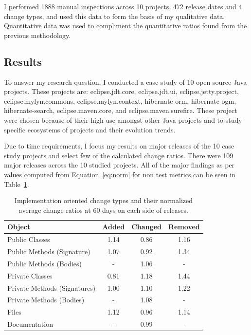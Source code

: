 I performed 1888 manual inspections across 10 projects, 472 release dates and 4 change types, and used this data to form the basis of my qualitative data.
Quantitative data was used to compliment the quantitative ratios found from the previous methodology. 

\subsection{Results}
\label{sec:apie-results}

To answer my research question, I conducted a case study of 10 open source Java projects. These projects are: eclipse.jdt.core, eclipse.jdt.ui, eclipse.jetty.project, 
eclipse.mylyn.commons, eclipse.mylyn.context, hibernate-orm, hibernate-ogm, hibernate-search, eclipse.maven.core, and eclipse.maven.surefire. These project were chosen
because of their high use amongst other Java projects and to study specific ecosystems of projects and their evolution trends.

Due to time requirements, I focus my results on major releases of the 10 case study projects and select few of the calculated change ratios. 
There were 109 major releases across the 10 studied projects. All of the major findings as per values computed from Equation~\ref{eq:norm} for non test metrics
can be seen in Table~\ref{tab:apie-ratio}.

\begin{table}[ht]
\begin{center}
\tabcolsep=0.11cm
\begin{tabular}{| l | c | c | c |}
\hline
Object & Added & Changed & Removed\\
\hline
Public Classes & 1.14 & 0.86 & 1.16 \\
Public Methods (Signature) & 1.07 & 0.92 & 1.34 \\
Public Methods (Bodies) & - & 1.06 & - \\
Private Classes & 0.81 & 1.18 & 1.44 \\
Private Methods (Signatures) & 1.00 & 1.10 & 1.22 \\
Private Methods (Bodies) & - & 1.08 & - \\
Files & 1.12 & 0.96 & 1.14 \\
Documentation & - & 0.99 & - \\
\hline
\end{tabular}
\end{center}
\caption{Implementation oriented change types and their normalized average change ratios at 60 days on each side of releases. \label{tab:apie-ratio}}
\end{table}

